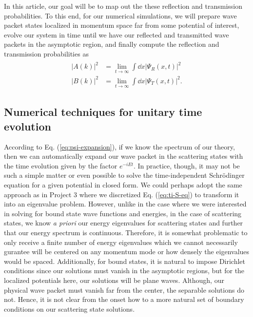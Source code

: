 In this article, our goal will be to map out the these reflection and transmission probabilities.
To this end, for our numerical simulations, we will prepare wave packet states localized in momentum space far from some potential of interest, evolve our system in time until we have our reflected and transmitted wave packets in the asymptotic region, and finally compute the reflection and transmission probabilities as
\begin{align}
\begin{aligned} 
    |A(k)|^2 &= \lim_{t \rightarrow \infty} \int \dd{x} |\Psi_{R}(x,t)|^2 \\
    |B(k)|^2 &= \lim_{t \rightarrow \infty} \int \dd{x} |\Psi_{T}(x,t)|^2
.\end{aligned}
\end{align}


\subsection{Numerical techniques for unitary time evolution}
\label{ssec:numerical-techniques-for-unitary-time-evolution}

According to Eq. (\ref{eq:psi-expansion}), if we know the spectrum of our theory, then we can automatically expand our wave packet in the scattering states with the time evolution given by the factor $e^{-i E t}$.
In practice, though, it may not be such a simple matter or even possible to solve the time-independent Schr\"{o}dinger equation for a given potential in closed form.
We could perhaps adopt the same approach as in Project 3 where we discretized Eq. (\ref{eq:ti-S-eq}) to transform it into an eigenvalue problem.
However, unlike in the case where we were interested in solving for bound state wave functions and energies, in the case of scattering states, we know \textit{a priori} our energy eigenvalues for scattering states and further that our energy spectrum is continuous.
Therefore, it is somewhat problematic to only receive a finite number of energy eigenvalues which we cannot necessarily gurantee will be centered on any momentum mode or how densely the eigenvalues would be spaced.
Additionally, for bound states, it is natural to impose Dirichlet conditions since our solutions must vanish in the asymptotic regions, but for the localized potentials here, our solutions will be plane waves.
Although, our physical wave packet must vanish far from the center, the separable solutions do not.
Hence, it is not clear from the onset how to a more natural set of boundary conditions on our scattering state solutions.

